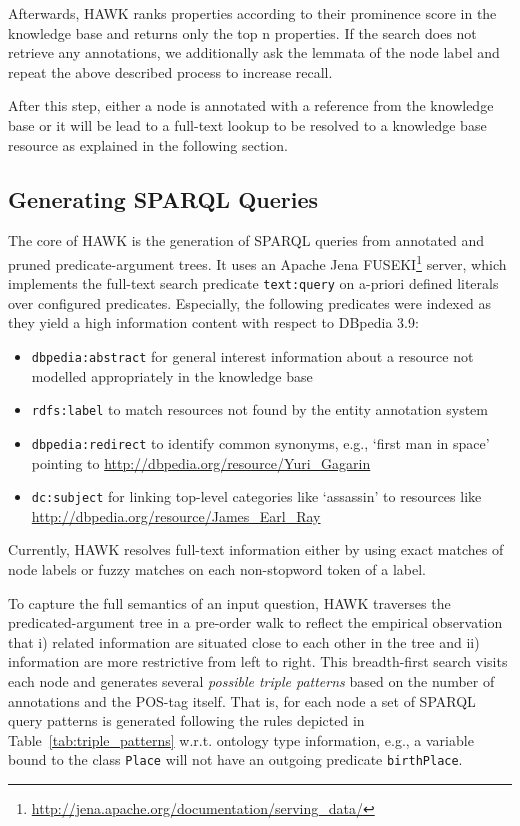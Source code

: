 Afterwards, HAWK ranks properties according to their prominence score in the knowledge base and returns only the top n properties.
If the search does not retrieve any annotations, we additionally ask the lemmata of the node label and repeat the above described process to increase recall.

After this step, either a node is annotated with a reference from the knowledge base %
or it will be lead to a full-text lookup to be resolved to a knowledge base resource as explained in the following section.


\subsection{Generating SPARQL Queries}
\label{chahawk:sec:full-text}

The core of HAWK is the generation of SPARQL queries from annotated and pruned predicate-argument trees.
It uses an Apache Jena FUSEKI\footnote{\url{http://jena.apache.org/documentation/serving_data/}} server, which implements the full-text search predicate \texttt{text:query} on a-priori defined literals over configured predicates. %
Especially, the following predicates were indexed as they yield a high information content with respect to DBpedia 3.9:
\begin{itemize}
 \item \texttt{dbpedia:abstract} for general interest information about a resource not modelled appropriately in the knowledge base
 \item \texttt{rdfs:label} to match resources not found by the entity annotation system%
 \item \texttt{dbpedia:redirect} to identify common synonyms, e.g., `first man in space' pointing to \url{http://dbpedia.org/resource/Yuri_Gagarin}
 \item \texttt{dc:subject} for linking top-level categories like `assassin' to resources like \url{http://dbpedia.org/resource/James_Earl_Ray}
\end{itemize}
Currently, HAWK resolves full-text information either by using exact matches of node labels or fuzzy matches on each non-stopword token of a label.

To capture the full semantics of an input question, HAWK traverses the predicated-argument tree in a pre-order walk to reflect the empirical observation that i) related information are situated close to each other in the tree and ii) information are more restrictive from left to right.
This breadth-first search visits each node and generates several \emph{possible triple patterns} based on the number of annotations and the POS-tag itself. 
That is, for each node a set of SPARQL query patterns is generated following the rules depicted in Table~\ref{tab:triple_patterns} w.r.t. ontology type information, e.g., a variable bound to the class \texttt{Place} will not have an outgoing predicate \texttt{birthPlace}.

